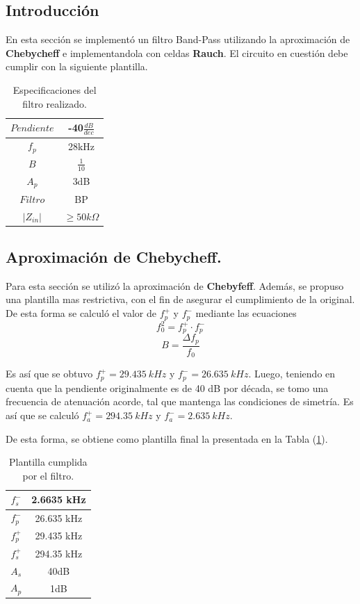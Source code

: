 \subsection{Introducción}

En esta sección se implementó un filtro Band-Pass utilizando la aproximación de \textbf{Chebycheff} e implementandola con celdas \textbf{Rauch}. El circuito en cuestión debe cumplir con la siguiente plantilla.
\begin{table}[H]
\centering
\begin{tabular}{|c|c|}
\hline
$Pendiente$      & -40$\frac{dB}{dec}$           \\ \hline
$f_p$      & 28kHz          \\ \hline
$B$      & $\frac{1}{10}$           \\ \hline
$A_p$      & 3dB               \\ \hline
$Filtro$      & BP              \\ \hline
$|Z_{in}|$ & $\geq 50k \Omega$ \\ \hline
\end{tabular}
\caption{Especificaciones del filtro realizado.}
\end{table}

\subsection{Aproximación de Chebycheff.}
Para esta sección se utilizó la aproximación de \textbf{Chebyfeff}. Además, se propuso una plantilla mas restrictiva, con el fin de asegurar el cumplimiento de la original. De esta forma se calculó el valor de $f_p^+$ y $f_p^-$ mediante las ecuaciones
\begin{equation}
	f_0^2 = f_p^+ \cdot f_p^-
\end{equation}
\begin{equation}
	B = \frac{\Delta f_p}{f_0}
\end{equation}

Es así que se obtuvo $f_p^+ =29.435 \ kHz$ y $f_p^- = 26.635 \ kHz$. Luego, teniendo en cuenta que la pendiente originalmente es de 40 dB por década, se tomo una frecuencia de atenuación acorde, tal que mantenga las condiciones de simetría. Es así que se calculó $f_a^+= 294.35 \ kHz$ y $f_a^- = 2.635 \ kHz$.

De esta forma, se obtiene como plantilla final la presentada en la Tabla (\ref{tab:plantilla}).
\begin{table}[H]
\centering
\begin{tabular}{|c|c|}
\hline
$f_s^-$      & 2.6635 kHz          \\ \hline
$f_p^-$      & 26.635 kHz         \\ \hline
$f_p^+$      & 29.435 kHz           \\ \hline
$f_s^+$      & 294.35 kHz          \\ \hline
$A_s$      & 40dB           \\ \hline
$A_p$      & 1dB               \\ \hline
\end{tabular}
\caption{Plantilla cumplida por el filtro.}
\label{tab:plantilla}
\end{table}

